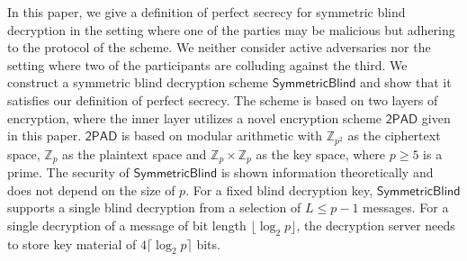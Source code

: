 \documentclass[10pt,journal]{IEEEtran}
\newcommand{\Z}{\mathbb{Z}}
\newcommand{\sch}[1]{\mathsf{#1}}
\begin{document}
In this paper, we give a definition of perfect secrecy for symmetric blind decryption in the setting where
one of the parties may be malicious but adhering to the protocol of the scheme.
We neither consider active adversaries nor the setting where two of the participants
are colluding against the third.
We construct a symmetric blind decryption scheme $\sch{SymmetricBlind}$ and show that it satisfies our definition
of perfect secrecy. The scheme is based on two layers of encryption, where the inner layer utilizes a novel
encryption scheme $\sch{2PAD}$ given in this paper. $\sch{2PAD}$ is based on modular arithmetic with $\Z_{p^2}$
as the ciphertext space, $\Z_{p}$ as the plaintext space and $\Z_p \times \Z_p$ as the key space, where $p \geq 5$ is a prime.
The security of $\sch{SymmetricBlind}$ is shown information theoretically and does not depend on the size of $p$.
For a fixed blind decryption key, $\sch{SymmetricBlind}$ supports a single blind decryption from a selection
of $L \leq p-1$ messages.
For a single decryption of a message of bit length $\lfloor \log_2 p \rfloor$, the decryption server
needs to store key material of $4 \lceil \log_2 p \rceil$ bits.
\end{document}

